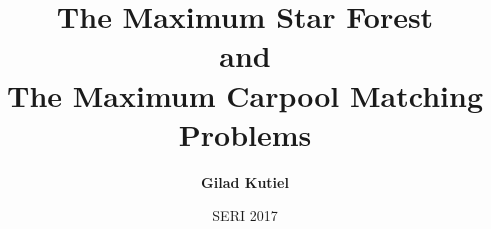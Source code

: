\title{
The Maximum Star Forest 
\\
and 
\\
The Maximum Carpool Matching
\\
Problems 
}
\author[shortname]{
    \textbf{Gilad Kutiel}
}
\date{SERI 2017}

